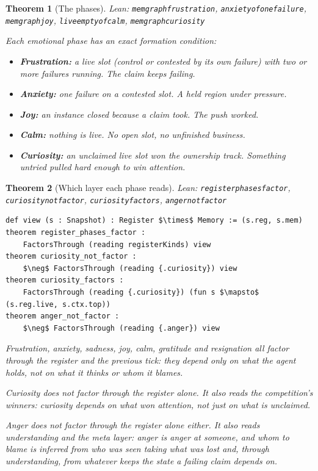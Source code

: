 \documentclass[11pt]{article}
\newcommand{\leanus}{\textunderscore\allowbreak}
\newcommand{\lean}[1]{{\let\_\leanus\texttt{#1}}}
\newtheorem{theorem}{Theorem}[section]
\theoremstyle{remark}
\begin{document}
\begin{theorem}[The phases]
{\small\sloppy Lean: \lean{mem\_graph\_frustration},
\lean{anxiety\_of\_one\_failure}, \lean{mem\_graph\_joy},
\lean{live\_empty\_of\_calm}, \lean{mem\_graph\_curiosity}\par}
Each emotional phase has an exact formation condition:
\begin{itemize}[nosep]
    \item \textbf{Frustration:} a live slot (control or contested by its own failure) with
    two or more failures running. The claim keeps failing.
    \item \textbf{Anxiety:} one failure on a contested slot. A held region under pressure.
    \item \textbf{Joy:} an instance closed because a claim took. The push worked.
    \item \textbf{Calm:} nothing is live. No open slot, no unfinished business.
    \item \textbf{Curiosity:} an unclaimed live slot won the ownership track. Something
    untried pulled hard enough to win attention.
\end{itemize}
\end{theorem}

\begin{theorem}[Which layer each phase reads]
{\small\sloppy Lean: \lean{register\_phases\_factor},
\lean{curiosity\_not\_factor}, \lean{curiosity\_factors},
\lean{anger\_not\_factor}\par}
\begin{lstlisting}
def view (s : Snapshot) : Register $\times$ Memory := (s.reg, s.mem)
theorem register_phases_factor :
    FactorsThrough (reading registerKinds) view
theorem curiosity_not_factor :
    $\neg$ FactorsThrough (reading {.curiosity}) view
theorem curiosity_factors :
    FactorsThrough (reading {.curiosity}) (fun s $\mapsto$ (s.reg.live, s.ctx.top))
theorem anger_not_factor :
    $\neg$ FactorsThrough (reading {.anger}) view
\end{lstlisting}

Frustration, anxiety, sadness, joy, calm, gratitude and resignation all factor through
the register and the previous tick: they depend only on what the agent holds, not on what
it thinks or whom it blames.

Curiosity does not factor through the register alone. It also reads the competition's
winners: curiosity depends on what won attention, not just on what is unclaimed.

Anger does not factor through the register alone either. It also reads understanding and
the meta layer: anger is anger \emph{at someone}, and whom to blame is inferred from who
was seen taking what was lost and, through understanding, from whatever keeps the state a
failing claim depends on.
\end{theorem}
\end{document}
